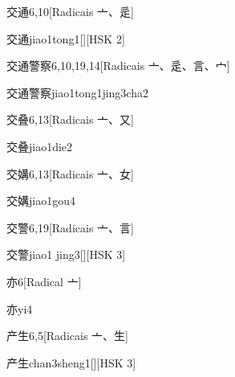 \begin{entry}{交通}{6,10}[Radicais ⼇、⾡]
  \begin{phonetics}{交通}{jiao1tong1}[][HSK 2]
  \end{phonetics}
\end{entry}

\begin{entry}{交通警察}{6,10,19,14}[Radicais ⼇、⾡、⾔、⼧]
  \begin{phonetics}{交通警察}{jiao1tong1jing3cha2}
  \end{phonetics}
\end{entry}

\begin{entry}{交叠}{6,13}[Radicais ⼇、⼜]
  \begin{phonetics}{交叠}{jiao1die2}
  \end{phonetics}
\end{entry}

\begin{entry}{交媾}{6,13}[Radicais ⼇、⼥]
  \begin{phonetics}{交媾}{jiao1gou4}
  \end{phonetics}
\end{entry}

\begin{entry}{交警}{6,19}[Radicais ⼇、⾔]
  \begin{phonetics}{交警}{jiao1 jing3}[][HSK 3]
  \end{phonetics}
\end{entry}

\begin{entry}{亦}{6}[Radical ⼇]
  \begin{phonetics}{亦}{yi4}
  \end{phonetics}
\end{entry}

\begin{entry}{产生}{6,5}[Radicais ⼇、⽣]
  \begin{phonetics}{产生}{chan3sheng1}[][HSK 3]
  \end{phonetics}
\end{entry}

